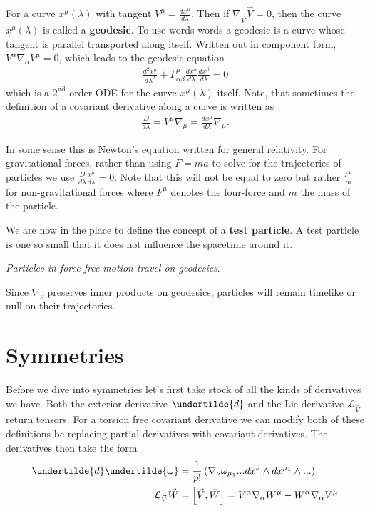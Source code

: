 \documentclass[10pt]{article}
\begin{document}
    For a curve $x^\mu (\lambda)$ with tangent $V^\mu = \frac{ dx^\mu}{d\lambda}$. Then if $\nabla_{\vec V} \vec V = 0$, then the curve  $x^\mu (\lambda)$ is called a \textbf{geodesic}.  To use words  words a geodesic is a curve whose tangent is parallel transported along itself. Written out in component form, $ V^\alpha \nabla_\alpha V^\mu = 0$, which leads to the geodesic equation 
    \begin{align}
    \frac{d^2 x^\mu}{d \lambda ^2} + \Gamma^{\mu}_{\alpha \beta} \frac{dx^\alpha}{d\lambda} \frac{dx^\beta}{d\lambda} = 0
    \end{align}
    which is a $2^\text{nd}$ order ODE for the curve $x^\mu (\lambda)$ itself. Note, that sometimes the definition of a covariant derivative along a curve is written as 
    \begin{align}
    \frac{D}{d \lambda} = V^\mu \nabla_\mu = \frac{dx^\mu}{d\lambda} \nabla_\mu. 
    \end{align}
    
    In some sense this is Newton's equation written for general relativity. For gravitational forces, rather than using $F=ma$ to solve for the trajectories of particles we use $\frac{D}{d\lambda} \frac{x^\mu}{d\lambda} = 0$. Note that this will not be equal to zero but rather $\frac{F^\mu}{m}$ for non-gravitational forces where $F^\mu$ denotes the four-force and $m$ the mass of the particle.
    
    We are now in the place to define the concept of a \textbf{test particle}. A test particle is one so small that it does not influence the spacetime around it. \\ 
    \begin{minipage}{50em}
 \textit{ \quad\quad \quad\quad \quad\quad \quad\quad \quad\quad Particles in force free motion travel on geodesics}. 
\end{minipage}
    Since $\nabla_\nu$ preserves inner products on geodesics, particles will remain timelike or null on their trajectories. 
   
   \section{Symmetries}
   Before we dive into symmetries let's first take stock of all the kinds of derivatives we have. Both the exterior derivative $\undertilde{d}$ and the Lie derivative $\mathcal{L}_{\vec V}$ return tensors. For a torsion free covariant derivative we can modify both of these definitions be replacing partial derivatives with covariant derivatives. The derivatives then take the form 
   \begin{align*}
   \undertilde{d}\undertilde{\omega} &= \frac{1}{p!} \left( \nabla_\nu \omega_{\mu_1} ... d x^\nu \wedge dx^{\mu_1}\wedge...\right)\\
   \mathcal{L}_{\vec V} \vec W &= \left[ \vec V, \vec W \right] = V^\alpha \nabla_\alpha W^\mu - W^\alpha \nabla_\alpha V^\mu
   \end{align*}
   
\end{document}
